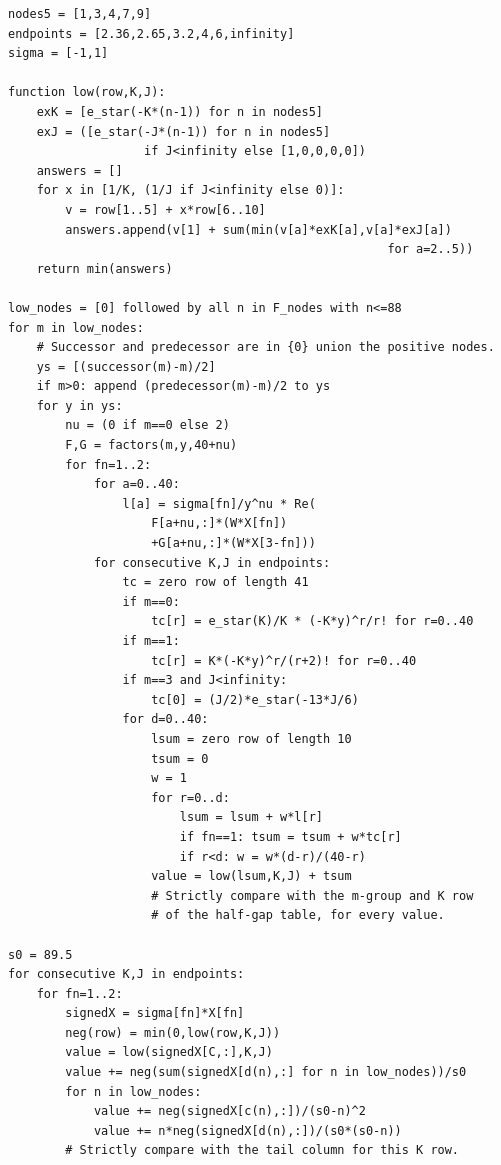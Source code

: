 \begin{lstlisting}[basicstyle=\ttfamily\footnotesize,columns=fullflexible,
breaklines=true,frame=single,caption={Floor-rounded verification: every half-gap and tail inequality},label=alg:finite-signs]
nodes5 = [1,3,4,7,9]
endpoints = [2.36,2.65,3.2,4,6,infinity]
sigma = [-1,1]

function low(row,K,J):
    exK = [e_star(-K*(n-1)) for n in nodes5]
    exJ = ([e_star(-J*(n-1)) for n in nodes5]
                   if J<infinity else [1,0,0,0,0])
    answers = []
    for x in [1/K, (1/J if J<infinity else 0)]:
        v = row[1..5] + x*row[6..10]
        answers.append(v[1] + sum(min(v[a]*exK[a],v[a]*exJ[a])
                                                     for a=2..5))
    return min(answers)

low_nodes = [0] followed by all n in F_nodes with n<=88
for m in low_nodes:
    # Successor and predecessor are in {0} union the positive nodes.
    ys = [(successor(m)-m)/2]
    if m>0: append (predecessor(m)-m)/2 to ys
    for y in ys:
        nu = (0 if m==0 else 2)
        F,G = factors(m,y,40+nu)
        for fn=1..2:
            for a=0..40:
                l[a] = sigma[fn]/y^nu * Re(
                    F[a+nu,:]*(W*X[fn])
                    +G[a+nu,:]*(W*X[3-fn]))
            for consecutive K,J in endpoints:
                tc = zero row of length 41
                if m==0:
                    tc[r] = e_star(K)/K * (-K*y)^r/r! for r=0..40
                if m==1:
                    tc[r] = K*(-K*y)^r/(r+2)! for r=0..40
                if m==3 and J<infinity:
                    tc[0] = (J/2)*e_star(-13*J/6)
                for d=0..40:
                    lsum = zero row of length 10
                    tsum = 0
                    w = 1
                    for r=0..d:
                        lsum = lsum + w*l[r]
                        if fn==1: tsum = tsum + w*tc[r]
                        if r<d: w = w*(d-r)/(40-r)
                    value = low(lsum,K,J) + tsum
                    # Strictly compare with the m-group and K row
                    # of the half-gap table, for every value.

s0 = 89.5
for consecutive K,J in endpoints:
    for fn=1..2:
        signedX = sigma[fn]*X[fn]
        neg(row) = min(0,low(row,K,J))
        value = low(signedX[C,:],K,J)
        value += neg(sum(signedX[d(n),:] for n in low_nodes))/s0
        for n in low_nodes:
            value += neg(signedX[c(n),:])/(s0-n)^2
            value += n*neg(signedX[d(n),:])/(s0*(s0-n))
        # Strictly compare with the tail column for this K row.
\end{lstlisting}

